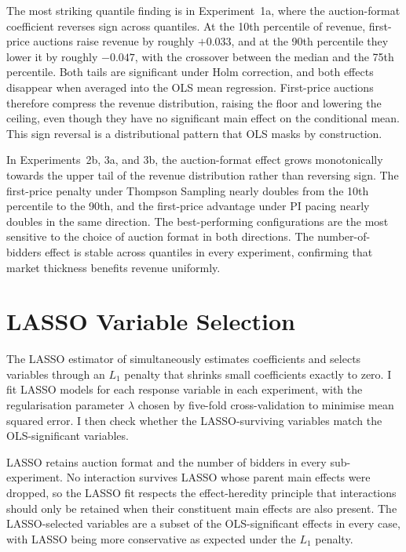 The most striking quantile finding is in Experiment~1a, where the auction-format coefficient reverses sign across quantiles. At the 10th percentile of revenue, first-price auctions raise revenue by roughly $+0.033$, and at the 90th percentile they lower it by roughly $-0.047$, with the crossover between the median and the 75th percentile. Both tails are significant under Holm correction, and both effects disappear when averaged into the OLS mean regression. First-price auctions therefore compress the revenue distribution, raising the floor and lowering the ceiling, even though they have no significant main effect on the conditional mean. This sign reversal is a distributional pattern that OLS masks by construction.

In Experiments~2b, 3a, and 3b, the auction-format effect grows monotonically towards the upper tail of the revenue distribution rather than reversing sign. The first-price penalty under Thompson Sampling nearly doubles from the 10th percentile to the 90th, and the first-price advantage under PI pacing nearly doubles in the same direction. The best-performing configurations are the most sensitive to the choice of auction format in both directions. The number-of-bidders effect is stable across quantiles in every experiment, confirming that market thickness benefits revenue uniformly.

\section{LASSO Variable Selection}
\label{sec:app_lasso}

The LASSO estimator of \citet{Tibshirani1996} simultaneously estimates coefficients and selects variables through an $L_1$ penalty that shrinks small coefficients exactly to zero. I fit LASSO models for each response variable in each experiment, with the regularisation parameter $\lambda$ chosen by five-fold cross-validation to minimise mean squared error. I then check whether the LASSO-surviving variables match the OLS-significant variables.

LASSO retains auction format and the number of bidders in every sub-experiment. No interaction survives LASSO whose parent main effects were dropped, so the LASSO fit respects the effect-heredity principle that interactions should only be retained when their constituent main effects are also present. The LASSO-selected variables are a subset of the OLS-significant effects in every case, with LASSO being more conservative as expected under the $L_1$ penalty.

